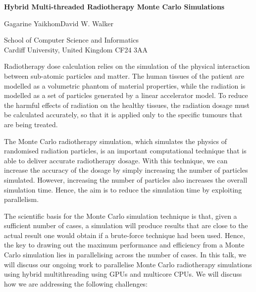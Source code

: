 \documentclass[a4paper]{article}
\begin{document}
\begin{center}
{\Large\bf Hybrid Multi-threaded Radiotherapy Monte Carlo Simulations}

\vspace*{1cm}

{\large Gagarine Yaikhom\quad \quad \quad David W. Walker}

\bigskip

School of Computer Science and Informatics\\
Cardiff University, United Kingdom CF24 3AA
\end{center}

\vspace*{0.15cm}

Radiotherapy dose calculation relies on the simulation of the physical interaction between sub-atomic particles and matter. The human tissues of the patient are modelled as a volumetric phantom of material properties, while the radiation is modelled as a set of particles generated by a linear accelerator model. To reduce the harmful effects of radiation on the healthy tissues, the radiation dosage must be calculated accurately, so that it is applied only to the specific tumours that are being treated.

The Monte Carlo radiotherapy simulation, which simulates the physics of randomised radiation particles, is an important computational technique that is able to deliver accurate radiotherapy dosage. With this technique, we can increase the accuracy of the dosage by simply increasing the number of particles simulated. However, increasing the number of particles also increases the overall simulation time. Hence, the aim is to reduce the simulation time by exploiting parallelism.

The scientific basis for the Monte Carlo simulation technique is that, given a sufficient number of cases, a simulation will produce results that are close to the actual result one would obtain if a brute-force technique had been used. Hence, the key to drawing out the maximum performance and efficiency from a Monte Carlo simulation lies in parallelising across the number of cases. In this talk, we will discuss our ongoing work to parallelise Monte Carlo radiotherapy simulations using hybrid multithreading using GPUs and multicore CPUs. We will discuss how we are addressing the following challenges:
\end{document}
